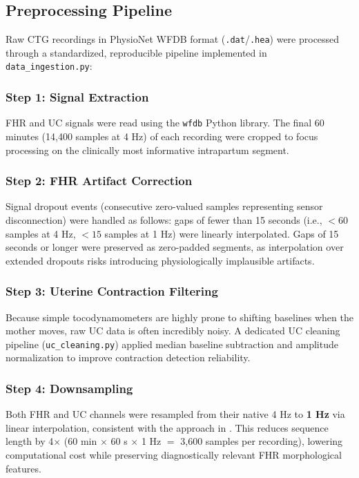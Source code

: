 \documentclass[conference]{IEEEtran}
\begin{document}
\subsection{Preprocessing Pipeline}

Raw CTG recordings in PhysioNet WFDB format (\texttt{.dat}/\texttt{.hea})
were processed through a standardized, reproducible pipeline implemented in
\texttt{data\_ingestion.py}:

\subsubsection{Step 1: Signal Extraction}
FHR and UC signals were read using the \texttt{wfdb} Python library. The
final 60 minutes (14,400 samples at 4 Hz) of each recording were cropped to
focus processing on the clinically most informative intrapartum segment.

\subsubsection{Step 2: FHR Artifact Correction}
Signal dropout events (consecutive zero-valued samples representing sensor
disconnection) were handled as follows: gaps of fewer than 15 seconds
(i.e., $< 60$ samples at 4 Hz, $< 15$ samples at 1 Hz) were linearly
interpolated. Gaps of 15 seconds or longer were preserved as zero-padded
segments, as interpolation over extended dropouts risks introducing
physiologically implausible artifacts.

\subsubsection{Step 3: Uterine Contraction Filtering}
Because simple tocodynamometers are highly prone to shifting baselines when the mother moves, raw UC data is often incredibly noisy. A dedicated UC cleaning pipeline
(\texttt{uc\_cleaning.py}) applied median baseline subtraction and
amplitude normalization to improve contraction detection reliability.

\subsubsection{Step 4: Downsampling}
Both FHR and UC channels were resampled from their native 4 Hz to
\textbf{1 Hz} via linear interpolation, consistent with the approach in
\cite{mendis2023}. This reduces sequence length by 4$\times$ (60 min $\times$
60 s $\times$ 1 Hz $=$ 3,600 samples per recording), lowering computational
cost while preserving diagnostically relevant FHR morphological features.
\end{document}
